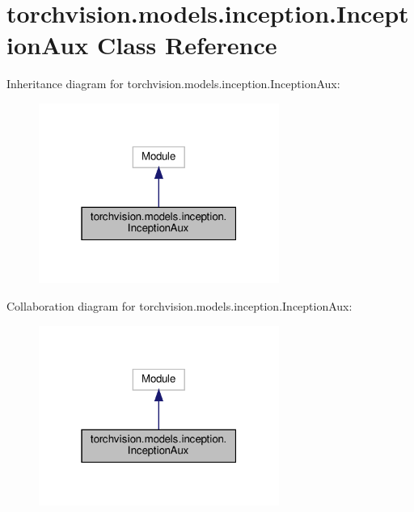 \hypertarget{classtorchvision_1_1models_1_1inception_1_1InceptionAux}{}\section{torchvision.\+models.\+inception.\+Inception\+Aux Class Reference}
\label{classtorchvision_1_1models_1_1inception_1_1InceptionAux}


Inheritance diagram for torchvision.\+models.\+inception.\+Inception\+Aux\+:
\nopagebreak
\begin{figure}[H]
\begin{center}
\leavevmode
\includegraphics[width=223pt]{classtorchvision_1_1models_1_1inception_1_1InceptionAux__inherit__graph}
\end{center}
\end{figure}


Collaboration diagram for torchvision.\+models.\+inception.\+Inception\+Aux\+:
\nopagebreak
\begin{figure}[H]
\begin{center}
\leavevmode
\includegraphics[width=223pt]{classtorchvision_1_1models_1_1inception_1_1InceptionAux__coll__graph}
\end{center}
\end{figure}
